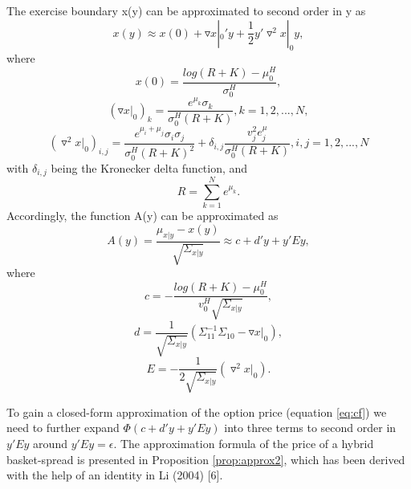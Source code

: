 \documentclass[a4paper]{article}
\begin{document}
\begin{prop}
\label{prop:approx}
The exercise boundary x(y) can be approximated to second order in y as
$$x(y)\approx x(0)+\triangledown x|_0'y+\frac{1}{2}y'\triangledown^2x|_0y,$$
where
$$x(0)=\frac{log(R+K)-\mu_0^H}{\sigma_0^H},$$
$$(\triangledown x|_0)_k=\frac{e^{\mu_k}\sigma_k}{\sigma_0^H(R+K)},k=1,2,...,N,$$
$$(\triangledown^2 x|_0)_{i,j}=\frac{e^{\mu_i+\mu_j}\sigma_i\sigma_j}{\sigma_0^H(R+K)^2}+\delta_{i,j}\frac{v_j^2e^\mu_j}{\sigma_0^H(R+K)},i,j=1,2,...,N$$
with $\delta_{i,j}$ being the Kronecker delta function, and
$$R=\sum_{k=1}^Ne^{\mu_k}.$$
Accordingly, the function A(y) can be approximated as
$$A(y)=\frac{\mu_{x|y}-x(y)}{\sqrt{\Sigma_{x|y}}}\approx c+d'y+y'Ey,$$
where
$$c=-\frac{log(R+K)-\mu_0^H}{v_0^H\sqrt{\Sigma_{x|y}}},$$
$$d=\frac{1}{\sqrt{\Sigma_{x|y}}}(\Sigma_{11}^{-1}\Sigma_{10}-\triangledown x|_0),$$
$$E=-\frac{1}{2\sqrt{\Sigma_{x|y}}}(\triangledown^2 x|_0).$$
\end{prop}
To gain a closed-form approximation of the option price (equation \ref{eq:cf}) we need to further expand $\Phi(c+d'y+y'Ey)$ into three terms to second order in $y'Ey$ around $y'Ey=\epsilon$. The approximation formula of the price of a hybrid basket-spread is presented in Proposition \ref{prop:approx2}, which has been derived with the help of an identity in Li (2004) [6]. 
\end{document}

